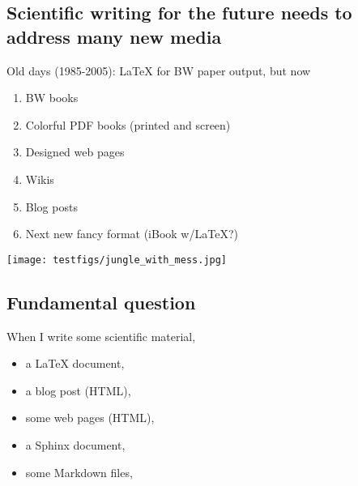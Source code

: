 \documentclass[%
oneside,                 %
final,                   %
10pt]{article}
\begin{document}

\subsection{Scientific writing for the future needs to address many new media}


Old days (1985-2005): {\LaTeX} for BW paper output, but now

\begin{enumerate}
  \item BW books

  \item Colorful PDF books (printed and screen)

  \item Designed web pages

  \item Wikis

  \item Blog posts

  \item Next new fancy format (iBook w/LaTeX?)
\end{enumerate}

\noindent


\vspace{6mm}

\centerline{\texttt{[image: testfigs/jungle\_with\_mess.jpg]}}

\vspace{6mm}



\subsection{Fundamental question}

When I write some scientific material,

\begin{itemize}
 \item a {\LaTeX} document,

 \item a blog post (HTML),

 \item some web pages (HTML),

 \item a Sphinx document,

 \item some Markdown files,
\end{itemize}
\end{document}
